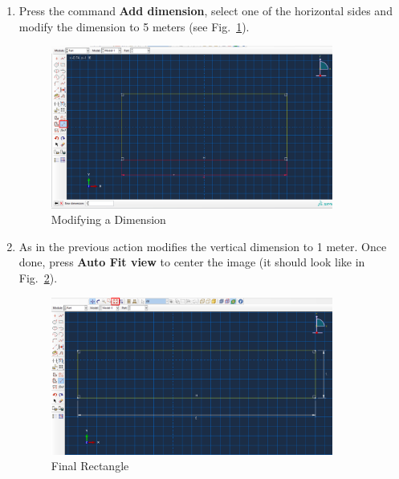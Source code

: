 \begin{enumerate}
\begin{enumerate}
  \item Press the command \textbf{Add dimension}, select one of the
    horizontal sides and modify the dimension to 5 meters (see
    Fig.~\ref{figu06}).
    \begin{figure}[!h]
      \begin{center}
        \includegraphics[width=0.875\textwidth]{./body/images/imagen06.pdf}
      \end{center}
      \caption{Modifying a Dimension}
      \label{figu06}
    \end{figure}

  \item As in the previous action modifies the vertical dimension to
    1 meter. Once done, press \textbf{Auto Fit view} to center the
    image (it should look like in Fig.~\ref{figu07}).
    \begin{figure}[!h]
      \begin{center}
        \includegraphics[width=0.875\textwidth]{./body/images/imagen07.pdf}
      \end{center}
      \caption{Final Rectangle}
      \label{figu07}
    \end{figure}


\end{enumerate}
\end{enumerate}
